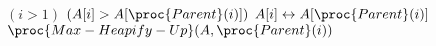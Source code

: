 \begin{codebox}
\li \If $(i > 1)$ \And $(A[i] > A[\proc{Parent}(i)])$
\li \Then
        $A[i] \leftrightarrow A[\proc{Parent}(i)]$
\li     $\proc{Max-Heapify-Up}(A,\proc{Parent}(i))$
    \End
\end{codebox}